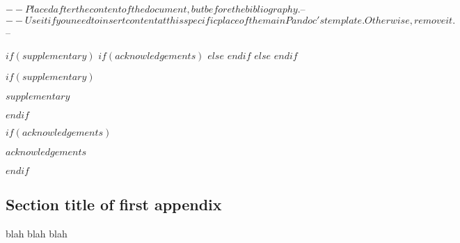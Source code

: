 $-- Placed after the content of the document, but before the bibliography.
$-- %
$-- Use it if you need to insert content at this specific place of the main Pandoc's template. Otherwise, remove it.
$-- %

$if(supplementary)$
$if(acknowledgements)$
\backmatter
$else$
\backmatter
$endif$
$else$
\backmatter
$endif$

$if(supplementary)$

$supplementary$

$endif$

$if(acknowledgements)$

$acknowledgements$

$endif$

\begin{appendices}

\section{Section title of first appendix}\label{secA1}

blah blah blah




\end{appendices}